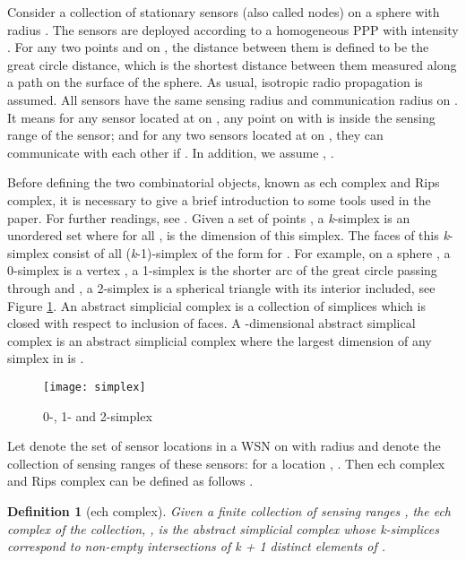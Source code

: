 \documentclass[journal, twoside]{IEEEtran}
\newtheorem{definition}{Definition}
\begin{document}
Consider a collection of stationary sensors (also called nodes)
on a sphere  with radius . The sensors are deployed
according to a homogeneous PPP with intensity .
For any two points  and  on ,
the distance between them  is defined to be the 
great circle distance, which is the shortest distance between  
them measured along a path on the surface of the sphere. 
As usual, isotropic radio propagation is assumed. All sensors 
have the same sensing radius  and communication radius 
on . It means for any sensor located at  on ,
any point  on  with  is inside the sensing range of the sensor;
and for any two sensors located at  on , they can communicate
with each other if .  In addition, we assume
, .

Before defining the two combinatorial objects, known as 
ech complex and Rips complex, 
it is necessary to give a brief introduction to some tools used
in the paper. For further readings, see \cite{ARM83, mun84, HAT02}.
Given a set of points , a \textit{k}-simplex is an
unordered set  where  for all ,  is the dimension of this simplex. The faces of this \textit{k}-simplex consist of
all (\textit{k}-1)-simplex of the form  for . For example, on a sphere ,
a 0-simplex  is a vertex , a 1-simplex  is the shorter arc
of the great circle passing through  and , a 2-simplex 
 is a spherical triangle  with its interior 
included, see Figure \ref{simplex}. An abstract simplicial complex is a collection of simplices which 
is closed with respect to inclusion of faces. A -dimensional abstract simplical complex 
is an abstract simplicial complex where the largest dimension of any simplex in  is .

\begin{figure}[ht]
  \centering
  \texttt{[image: simplex]}
  \caption{0-, 1- and 2-simplex}
  \label{simplex}
\end{figure}

Let  denote the set of
sensor locations in a WSN on  with radius  and   denote the collection of sensing
ranges of these sensors: for a location ,  . 
Then ech complex and Rips complex can be defined 
as follows \cite{DSG05,DSG07}.

\begin{definition}[ech complex] 
Given a finite collection of sensing ranges ,
the ech complex of the collection, , 
is the abstract simplicial complex whose \textit{k}-simplices correspond to non-empty
intersections of k + \emph{1} distinct elements of .
\end{definition}
\end{document}
